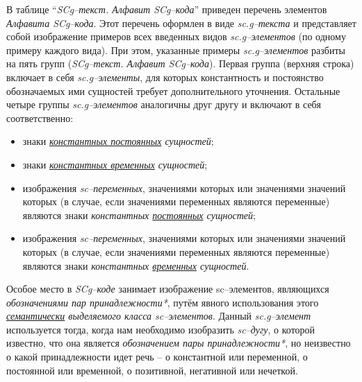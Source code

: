 \begin{SCn}
\end{SCn}

В таблице ``\textit{SCg--текст. Алфавит SCg--кода}'' приведен перечень элементов \textit{Алфавита SCg--кода}.
Этот перечень оформлен в виде \textit{sc.g--текста} и представляет собой изображение примеров всех введенных видов \textit{sc.g--элементов} (по одному примеру каждого вида). При этом, указанные примеры \textit{sc.g--элементов} разбиты на пять групп (\textit{SCg--текст. Алфавит SCg--кода}). Первая группа (верхняя строка) включает в себя \textit{sc.g--элементы}, для которых константность и постоянство обозначаемых ими сущностей требует дополнительного уточнения. Остальные четыре группы \textit{sc.g--элементов} аналогичны друг другу и включают в себя соответственно:

\begin{itemize}
	\item знаки \textit{\uline{константных постоянных} сущностей};
	\item знаки \textit{\uline{константных временных} сущностей};
	\item изображения \textit{sc--переменных}, значениями которых или значениями значений которых (в случае, если значениями переменных являются переменные) являются знаки \textit{константных \uline{постоянных} сущностей};
	\item изображения \textit{sc--переменных}, значениями которых или значениями значений которых (в случае, если значениями переменных являются переменные) являются знаки \textit{константных \uline{временных} сущностей}.
\end{itemize}

Особое место в \textit{SCg--коде} занимает изображение sc--элементов, являющихся \textit{обозначениями пар принадлежности*}, путём явного использования этого \textit {\uline{семантически} выделяемого класса sc--элементов}.
Данный \textit{sc.g--элемент} используется тогда, когда нам необходимо изобразить \textit{sc--дугу}, о которой известно, что она является \textit{обозначением пары принадлежности*}, но неизвестно о какой принадлежности идет речь -- о константной или переменной, о постоянной или временной, о позитивной, негативной или нечеткой.

